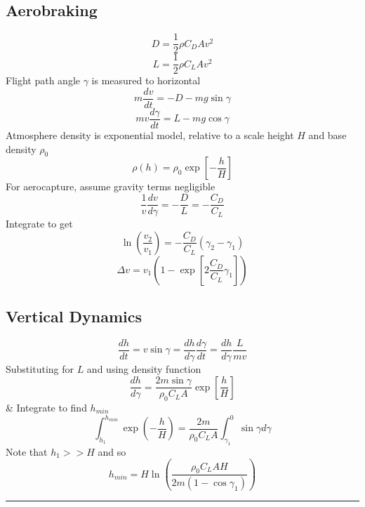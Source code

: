 \documentclass[table,cmyk]{article}
\begin{document}
\begin{longtable}
\section*{Aerobraking}
\[D = \frac{1}{2}\rho C_D A v^2\]
\[L = \frac{1}{2}\rho C_L Av^2\]
Flight path angle $\gamma$ is measured to horizontal
\[m\frac{dv}{dt} = -D-mg\sin \gamma\]
\[mv\frac{d\gamma}{dt} = L - mg\cos \gamma\]
Atmosphere density is exponential model, relative to a scale height $H$ and base density $\rho_0$
\[\rho(h) = \rho_0\exp \left[-\frac{h}{H}\right]\]
For aerocapture, assume gravity terms negligible
\[\frac{1}{v}\frac{dv}{d\gamma} = -\frac{D}{L} = -\frac{C_D}{C_L}\]
Integrate to get
\[\ln \left(\frac{v_2}{v_1}\right) = -\frac{C_D}{C_L}(\gamma_2-\gamma_1)\]
\[\Delta v = v_1\left( 1-\exp\left[ 2\frac{C_D}{C_L}\gamma_1\right]\right)\]
\subsection*{Vertical Dynamics}
\[\frac{dh}{dt} = v\sin \gamma = \frac{dh}{d\gamma}\frac{d\gamma}{dt} = \frac{dh}{d\gamma}\frac{L}{mv}\]
Substituting for $L$ and using density function
\[\frac{dh}{d\gamma} = \frac{2m\sin \gamma}{\rho_0 C_L A} \exp\left[\frac{h}{H}\right]\]
&
Integrate to find $h_{min}$
\[\int_{h_1}^{h_{min}}\exp \left( -\frac{h}{H}\right) = \frac{2m}{\rho_0 C_L A}\int_{\gamma_1}^{0}\sin \gamma d \gamma\]
Note that $h_1 >> H$ and so
\[h_{min} = H\ln \left( \frac{\rho_0C_LAH}{2m(1-\cos \gamma_1)}\right)\]

\noindent\rule{9cm}{0.4pt}
\tabularnewline\hline
\end{longtable}
\end{document}
